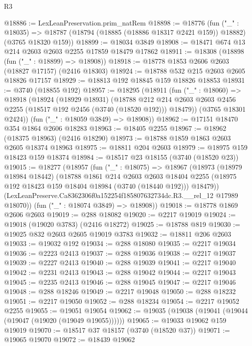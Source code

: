 \begin{lexlean}{R3}
\begin{coremodule}
@18886 := LexLeanPreservation.prim_natRem
@18898 := @18776
    (fun ("_" : @18035) =>
    @18787 (@18794 (@18885 (@18886 @18317 @2421 @159)) @18882) (@3765 @18320 @159))
@18899 := @18034 @3849
@18908 := @18471 @674 @13 @214 @2603 @2603 @2255 @17859 @18479 @17862
@18911 := @18308 (@18898 (fun ("_" : @18899) => @18908))
@18918 := @18778 @1853 @2606 @2603 (@18827 @17157) (@2416 @18303)
@18924 := @18788 @532 @215 @2603 @2605 @18826 @17157
@18929 := @18813 @192 @18845 @159 @18826 @18853
@18931 := @3740 (@18855 @192)
@18957 := @18295
    (@18911
      (fun ("_" : @18060) =>
      @18918
        (@18924
          (@18929 @18931)
          (@18788
            @212
            @214
            @2603
            @2603
            @2456
            @2255
            (@18517 @192 @2456 (@3740 (@18520 @192)))
            @18479))
        (@3765 @18301 @2424))
      (fun ("_" : @18059 @3849) => @18908))
@18962 := @17151 @18470 @354 @1864 @2606 @18283
@18963 := @18405 @2255
@18967 := @18962 (@18375 @18963) (@2416 @18290)
@18973 := @18788 @1859 @1863 @2603 @2605 @18374 @18963
@18975 := @18811 @204 @2603
@18979 := @18975 @159 @18423 @159 @18374
@18984 := @18517 @23 @18155 (@3740 (@18520 @23))
@19015 := @18277
    (@18957
      (fun ("_" : @18075) =>
      @18967
        (@18973
          (@18979 @18984 @18442)
          (@18788
            @1861
            @214
            @2603
            @2603
            @18404
            @2255
            (@18975 @192 @18423 @159 @18404 @18984 (@3740 (@18440 @192)))
            @18479))
        (LexLeanPreserve.Ca8362306f0a152254f185807632734dc.R3.__rel_12 @17989 @18070))
      (fun ("_" : @18074 @3849) => @18908))
@19018 := @18778 @1869 @2606 @2603
@19019 := @288 @18082
@19020 := @2217 @19019
@19024 := @19018 (@19020 @3783) (@2416 @18272)
@19025 := @18788 @819
@19030 := @19025 @832 @2603 @2605 @19019 @3783
@19032 := @18811 @206 @2603
@19033 := @19032 @192
@19034 := @288 @18080
@19035 := @2217 @19034
@19036 := @2223 @2413
@19037 := @288 @19036
@19038 := @2217 @19037
@19039 := @2227 @2413
@19040 := @288 @19039
@19041 := @2217 @19040
@19042 := @2231 @2413
@19043 := @288 @19042
@19044 := @2217 @19043
@19045 := @2235 @2413
@19046 := @288 @19045
@19047 := @2217 @19046
@19048 := @288 @18246
@19049 := @2217 @19048
@19050 := @288 @18232
@19051 := @2217 @19050
@19052 := @288 @18234
@19054 := @2217 @19052 @2255
@19055 := @19051 @19054
@19062 := @19035 (@19038 (@19041 (@19044 (@19047 (@19020 (@19049 @19055))))))
@19065 := @19033 @19062 @159 @19019
@19070 := @18517 @37 @18157 (@3740 (@18520 @37))
@19071 := @19065 @19070
@19072 := @18439 @19062

\end{coremodule}
\end{lexlean}
